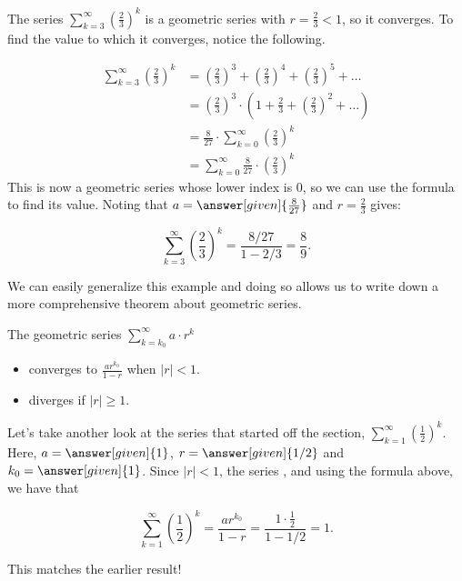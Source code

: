 \documentclass{ximera}
\begin{document}
\begin{example}
The series $\sum\limits_{k=3}^{\infty} \left(\frac{2}{3}\right)^k$ is a geometric series with $r=\frac{2}{3}<1$, so it converges.  To find the value to which it converges, notice the following.

\begin{align*}
\sum\limits_{k=3}^{\infty} \left(\frac{2}{3}\right)^k &=  \left(\frac{2}{3}\right)^3+ \left(\frac{2}{3}\right)^4+ \left(\frac{2}{3}\right)^5+\ldots \\
&= \left(\frac{2}{3}\right)^3 \cdot \left(1+ \frac{2}{3}+ \left(\frac{2}{3}\right)^2+\ldots\right) \\
&= \frac{8}{27}  \cdot  \sum_{k=0}^{\infty}\left(\frac{2}{3}\right)^k \\
&= \sum\limits_{k=0}^{\infty} \frac{8}{27}  \cdot \left(\frac{2}{3}\right)^k
\end{align*}
This is now a geometric series whose lower index is $0$, so we can use the formula to find its value. Noting that $a=\answer[given]{ \frac{8}{27} }$ and $r= \frac{2}{3}$ gives:

\[
\sum\limits_{k=3}^{\infty} \left(\frac{2}{3}\right)^k = \frac{8/27}{1-2/3} = \frac{8}{9}.
\]
\end{example}

We can easily generalize this example and doing so allows us to write down a more comprehensive theorem about geometric series.

\begin{theorem}
  The geometric series $\sum\limits_{k= k_0}^\infty a \cdot r^k$ 
  
  \begin{itemize} 
  \item converges to $\frac{ar^{k_0}}{1-r}$ when $|r| < 1$.
  \item diverges if $|r| \geq 1$.  
  \end{itemize}
  \end{theorem}
 
\begin{example}
Let's take another look at the series that started off the section, $\sum\limits_{k=1}^{\infty} \left(\frac{1}{2}\right)^k$.  Here, $a=\answer[given]{1}$, $r=\answer[given]{1/2}$ and $k_0 = \answer[given]{1}$.  Since $|r|<1$, the series , and using the formula above, we have that

\[ \sum\limits_{k=1}^{\infty} \left(\frac{1}{2}\right)^k = \frac{ar^{k_0}}{1-r} = \frac{1\cdot \frac{1}{2}}{1-1/2} =1.\]

This matches the earlier result!  
\end{example}
\end{document}
